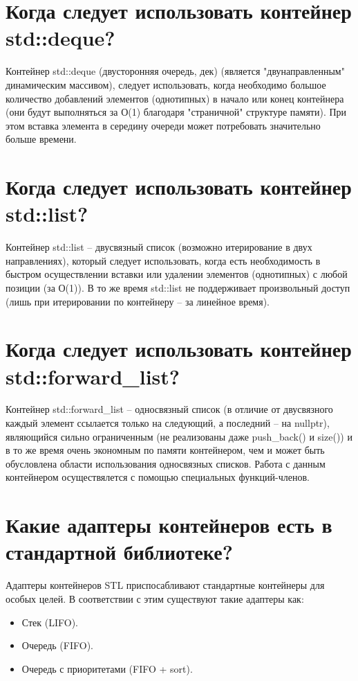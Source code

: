 \documentclass[a4paper,12pt]{article}	%
\begin{document}
\section{Когда следует использовать контейнер std::deque?}

	Контейнер std::deque (двусторонняя очередь, дек) (является "двунаправленным" динамическим массивом), следует использовать, когда необходимо большое количество добавлений элементов (однотипных) в начало или конец контейнера (они будут выполняться за О(1) благодаря "страничной" структуре памяти). При этом вставка элемента в середину очереди может потребовать значительно больше времени.

\section{Когда следует использовать контейнер std::list?}

	Контейнер std::list -- двусвязный список (возможно итерирование в двух направлениях), который следует использовать, когда есть необходимость в быстром осуществлении вставки или удалении элементов (однотипных) с любой позиции (за О(1)). В то же время std::list не поддерживает произвольный доступ (лишь при итерировании по контейнеру -- за линейное время).

\section{Когда следует использовать контейнер std::forward\_list?}

	Контейнер std::forward\_list -- односвязный список (в отличие от двусвязного каждый элемент ссылается только на следующий, а последний -- на nullptr), являющийся сильно ограниченным (не реализованы даже push\_back() и size()) и в то же время очень экономным по памяти контейнером, чем и может быть обусловлена области использования односвязных списков. Работа с данным контейнером осуществялется с помощью специальных функций-членов.

\section{Какие адаптеры контейнеров есть в стандартной библиотеке?}

	Адаптеры контейнеров STL приспосабливают стандартные контейнеры для особых целей. В соответствии с этим существуют такие адаптеры как:
	
	\begin{itemize}
	
		\item Стек (LIFO).
		
		\item Очередь (FIFO).
		
		\item Очередь с приоритетами (FIFO + sort).
	
	\end{itemize}
\end{document}

